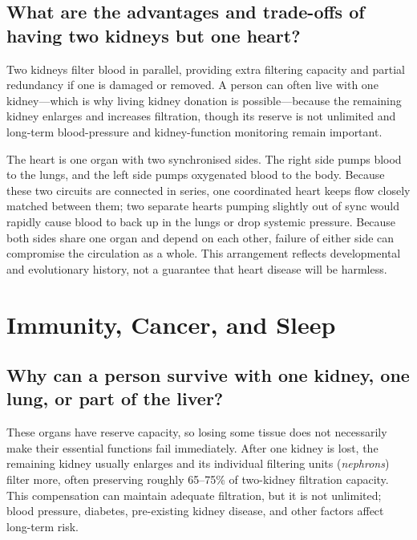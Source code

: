 \documentclass[11pt,oneside]{report}
\begin{document}
\section{What are the advantages and trade-offs of having two kidneys but one heart?}

Two kidneys filter blood in parallel, providing extra filtering capacity and
partial redundancy if one is damaged or removed. A person can often live with
one kidney---which is why living kidney donation is possible---because the
remaining kidney enlarges and increases filtration, though its reserve is not
unlimited and long-term blood-pressure and kidney-function monitoring remain
important.

The heart is one organ with two synchronised sides. The right side pumps blood
to the lungs, and the left side pumps oxygenated blood to the body. Because
these two circuits are connected in series, one coordinated heart keeps flow
closely matched between them; two separate hearts pumping slightly out of sync
would rapidly cause blood to back up in the lungs or drop systemic pressure.
Because both sides share one organ and depend on each other, failure of either
side can compromise the circulation as a whole. This arrangement reflects
developmental and evolutionary history, not a guarantee that heart disease will
be harmless.

\chapter{Immunity, Cancer, and Sleep}

\section{Why can a person survive with one kidney, one lung, or part of the liver?}

These organs have reserve capacity, so losing some tissue does not necessarily
make their essential functions fail immediately. After one kidney is lost, the
remaining kidney usually enlarges and its individual filtering units
(\emph{nephrons}) filter more, often preserving roughly 65--75\% of two-kidney
filtration capacity. This compensation can maintain adequate filtration, but it
is not unlimited; blood pressure, diabetes, pre-existing kidney disease, and
other factors affect long-term risk.
\end{document}
